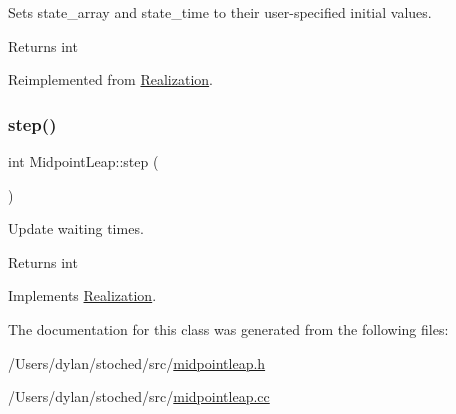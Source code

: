 Sets state\+\_\+array and state\+\_\+time to their user-\/specified initial values. 

\begin{DoxyReturn}{Returns}
int 
\end{DoxyReturn}


Reimplemented from \hyperlink{class_realization_a391a89af7574a9053f53f8a299c2cc70}{Realization}.

\mbox{\label{class_midpoint_leap_a8afc1a6a8777157f7b42ec08a848b564}} 
\subsubsection{\texorpdfstring{step()}{step()}}
{\footnotesize\ttfamily int Midpoint\+Leap\+::step (\begin{DoxyParamCaption}{ }\end{DoxyParamCaption})\hspace{0.3cm}{\ttfamily [virtual]}}



Update waiting times. 

\begin{DoxyReturn}{Returns}
int 
\end{DoxyReturn}


Implements \hyperlink{class_realization_a9949217117927b149850288f3b74c9ef}{Realization}.



The documentation for this class was generated from the following files\+:\begin{DoxyCompactItemize}
\item 
/\+Users/dylan/stoched/src/\hyperlink{midpointleap_8h}{midpointleap.\+h}\item 
/\+Users/dylan/stoched/src/\hyperlink{midpointleap_8cc}{midpointleap.\+cc}\end{DoxyCompactItemize}
